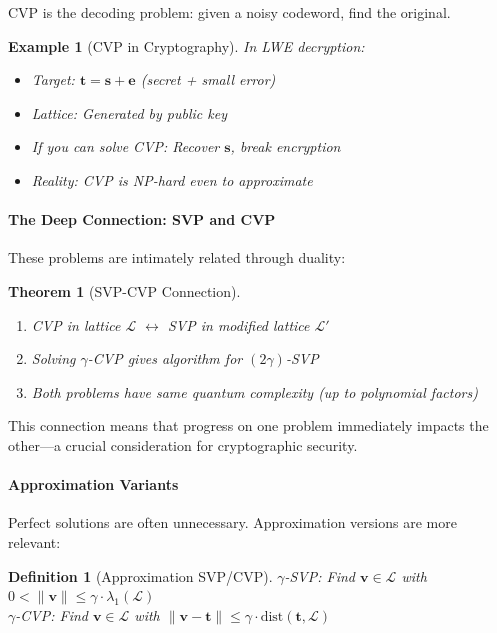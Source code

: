 \documentclass[11pt,a4paper]{article}
\newtheorem{definition}{Definition}
\newtheorem{theorem}{Theorem}
\newtheorem{example}{Example}
\begin{document}
CVP is the decoding problem: given a noisy codeword, find the original.

\begin{example}[CVP in Cryptography]
In LWE decryption:
\begin{itemize}
    \item Target: $\mathbf{t} = \mathbf{s} + \mathbf{e}$ (secret + small error)
    \item Lattice: Generated by public key
    \item If you can solve CVP: Recover $\mathbf{s}$, break encryption
    \item Reality: CVP is NP-hard even to approximate
\end{itemize}
\end{example}

\paragraph{The Deep Connection: SVP and CVP}

These problems are intimately related through duality:

\begin{theorem}[SVP-CVP Connection]
\begin{enumerate}
    \item CVP in lattice $\mathcal{L}$ $\leftrightarrow$ SVP in modified lattice $\mathcal{L}'$
    \item Solving $\gamma$-CVP gives algorithm for $(2\gamma)$-SVP
    \item Both problems have same quantum complexity (up to polynomial factors)
\end{enumerate}
\end{theorem}

This connection means that progress on one problem immediately impacts the other—a crucial consideration for cryptographic security.

\paragraph{Approximation Variants}

Perfect solutions are often unnecessary. Approximation versions are more relevant:

\begin{definition}[Approximation SVP/CVP]
$\gamma$-SVP: Find $\mathbf{v} \in \mathcal{L}$ with $0 < \|\mathbf{v}\| \leq \gamma \cdot \lambda_1(\mathcal{L})$\\
$\gamma$-CVP: Find $\mathbf{v} \in \mathcal{L}$ with $\|\mathbf{v} - \mathbf{t}\| \leq \gamma \cdot \text{dist}(\mathbf{t}, \mathcal{L})$
\end{definition}
\end{document}
